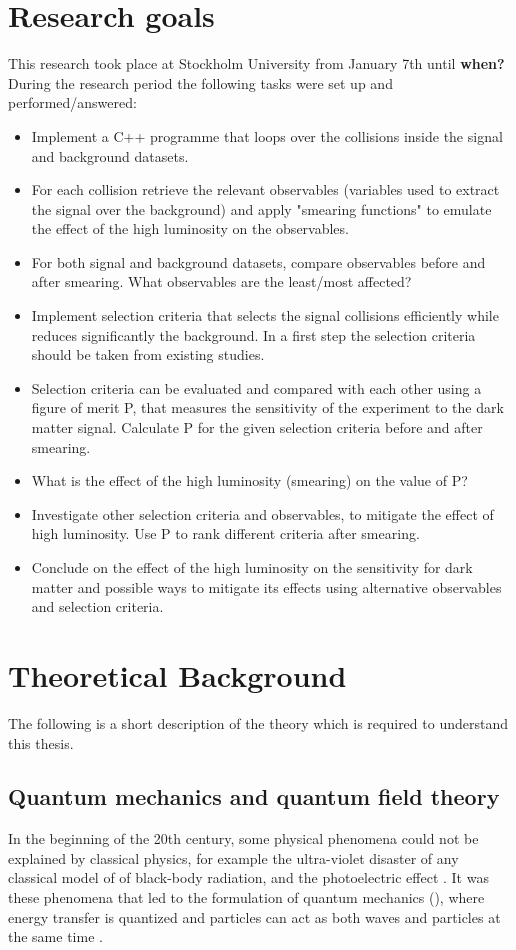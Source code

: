 \section{Research goals}\label{sec:goals}
This research took place at Stockholm University from January 7th until \textbf{when?}
During the research period the following tasks were set up and performed/answered:
\begin{itemize}
\item Implement a C++ programme that loops over the collisions inside the signal and background datasets.	
\item For each collision retrieve the relevant observables (variables used to	 extract the signal over the background) and apply "smearing functions" to emulate the effect of the high luminosity on the observables. 	
\item For both signal and background datasets, compare observables before and after smearing. What observables are the least/most affected?	
\item Implement selection criteria that selects the signal collisions efficiently while reduces significantly the background. In a first step the selection criteria should be taken from existing studies.
\item Selection criteria can be evaluated and compared with each other using a figure of merit P, that measures the sensitivity of the experiment to the	 dark matter signal. Calculate P for the given selection criteria before and after smearing.
\item What is the effect of the high luminosity (smearing) on the value of P?
\item Investigate other selection criteria and observables, to mitigate the effect of high luminosity. Use P to rank different criteria after smearing.
\item Conclude on the effect of the high luminosity on the sensitivity for dark matter and possible ways to mitigate its effects using alternative observables and selection criteria. 
\end{itemize}
\newpage
\section{Theoretical Background}\label{sec:tb}
The following is a short description of the theory which is required to understand this thesis. 
\subsection{Quantum mechanics and quantum field theory}\label{sec:tb:subsec:qm}
In the beginning of the 20th century, some physical phenomena could not be explained by classical physics, for example the ultra-violet disaster of any classical model of of black-body radiation, and the photoelectric effect \citep{Bransden:2000}.
It was these phenomena that led to the formulation of quantum mechanics (\abbrQM), where energy transfer is quantized and particles can act as both waves and particles at the same time \citep{Hallsjo:2013}.

